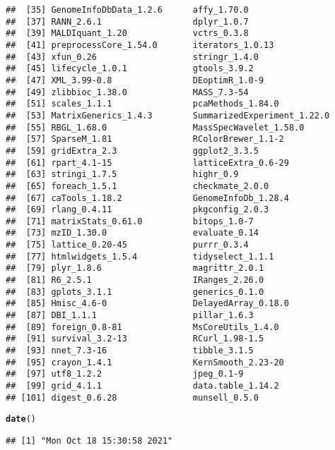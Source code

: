 \documentclass{article}\usepackage[]{graphicx}\usepackage[]{color}
\makeatletter
\newcommand{\hlstd}[1]{\textcolor[rgb]{0.345,0.345,0.345}{#1}}%
\newcommand{\hlkwd}[1]{\textcolor[rgb]{0.737,0.353,0.396}{\textbf{#1}}}%
\newenvironment{kframe}{%
 \def\at@end@of@kframe{}%
 \ifinner\ifhmode%
  \def\at@end@of@kframe{\end{minipage}}%
  \begin{minipage}{\columnwidth}%
 \fi\fi%
 \def\FrameCommand##1{\hskip\@totalleftmargin \hskip-\fboxsep
 \colorbox{shadecolor}{##1}\hskip-\fboxsep
     \hskip-\linewidth \hskip-\@totalleftmargin \hskip\columnwidth}%
 \MakeFramed {\advance\hsize-\width
   \@totalleftmargin\z@ \linewidth\hsize
   \@setminipage}}%
 {\par\unskip\endMakeFramed%
 \at@end@of@kframe}
\newenvironment{knitrout}{}{} %
\makeatother
\begin{document}
\begin{knitrout}
\begin{kframe}
\begin{verbatim}
##  [35] GenomeInfoDbData_1.2.6      affy_1.70.0                
##  [37] RANN_2.6.1                  dplyr_1.0.7                
##  [39] MALDIquant_1.20             vctrs_0.3.8                
##  [41] preprocessCore_1.54.0       iterators_1.0.13           
##  [43] xfun_0.26                   stringr_1.4.0              
##  [45] lifecycle_1.0.1             gtools_3.9.2               
##  [47] XML_3.99-0.8                DEoptimR_1.0-9             
##  [49] zlibbioc_1.38.0             MASS_7.3-54                
##  [51] scales_1.1.1                pcaMethods_1.84.0          
##  [53] MatrixGenerics_1.4.3        SummarizedExperiment_1.22.0
##  [55] RBGL_1.68.0                 MassSpecWavelet_1.58.0     
##  [57] SparseM_1.81                RColorBrewer_1.1-2         
##  [59] gridExtra_2.3               ggplot2_3.3.5              
##  [61] rpart_4.1-15                latticeExtra_0.6-29        
##  [63] stringi_1.7.5               highr_0.9                  
##  [65] foreach_1.5.1               checkmate_2.0.0            
##  [67] caTools_1.18.2              GenomeInfoDb_1.28.4        
##  [69] rlang_0.4.11                pkgconfig_2.0.3            
##  [71] matrixStats_0.61.0          bitops_1.0-7               
##  [73] mzID_1.30.0                 evaluate_0.14              
##  [75] lattice_0.20-45             purrr_0.3.4                
##  [77] htmlwidgets_1.5.4           tidyselect_1.1.1           
##  [79] plyr_1.8.6                  magrittr_2.0.1             
##  [81] R6_2.5.1                    IRanges_2.26.0             
##  [83] gplots_3.1.1                generics_0.1.0             
##  [85] Hmisc_4.6-0                 DelayedArray_0.18.0        
##  [87] DBI_1.1.1                   pillar_1.6.3               
##  [89] foreign_0.8-81              MsCoreUtils_1.4.0          
##  [91] survival_3.2-13             RCurl_1.98-1.5             
##  [93] nnet_7.3-16                 tibble_3.1.5               
##  [95] crayon_1.4.1                KernSmooth_2.23-20         
##  [97] utf8_1.2.2                  jpeg_0.1-9                 
##  [99] grid_4.1.1                  data.table_1.14.2          
## [101] digest_0.6.28               munsell_0.5.0
\end{verbatim}
\begin{alltt}
\hlkwd{date}\hlstd{()}
\end{alltt}
\begin{verbatim}
## [1] "Mon Oct 18 15:30:58 2021"
\end{verbatim}
\end{kframe}
\end{knitrout}
\end{document}
